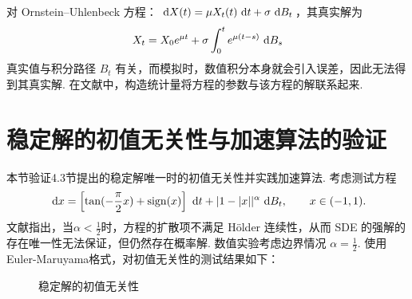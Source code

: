 对 Ornstein–Uhlenbeck 方程：$\text{ d} X(t) = \mu X_t(t) \text{ d} t + \sigma \text{ d} B_t $，其真实解为
\[
X_{t}=X_{0} e^{\mu t}+\sigma \int_{0}^{t} e^{\mu(t-s)} \text{ d} B_{s}
\]
真实值与积分路径 $B_t$ 有关，而模拟时，数值积分本身就会引入误差，因此无法得到其真实解. 在文献\cite{OUequation}中，构造统计量将方程的参数与该方程的解联系起来. 



\section{稳定解的初值无关性与加速算法的验证}
本节验证4.3节提出的稳定解唯一时的初值无关性并实践加速算法. 考虑测试方程
\begin{equation}\label{example6.2}
\text{ d} x  = \left[ \tan(-\frac\pi2x) + \operatorname{sign}(x) \right] \text{ d} t + |1-|x||^\alpha \text{ d} B_t,\qquad x\in (-1,1).
\end{equation}
文献\cite{Fokker_Planck}指出，当$\alpha < \frac12$时，方程的扩散项不满足 H{\"o}lder 连续性，从而 SDE 的强解的存在唯一性无法保证，但仍然存在概率解. 数值实验考虑边界情况 $\alpha = \frac12$. 
使用Euler-Maruyama格式，对初值无关性的测试结果如下：
\begin{figure}[!htbp]
	\centering 
	\vspace{.2cm}
	\caption{稳定解的初值无关性}
	\label{fig.6.2}
\end{figure}

